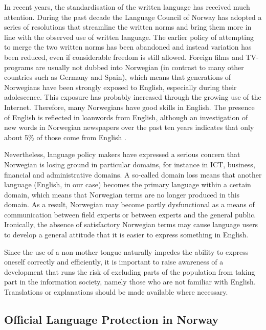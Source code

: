 \begin{multicols}{2}
In recent years, the standardisation of the written language has received much attention. 
During the past decade the Language Council of Norway has adopted a series of resolutions that streamline the written norms and bring them more in line with the observed use of written language. 
The earlier policy of attempting to merge the two written norms has been abandoned and instead variation has been reduced, even if considerable freedom is still allowed.
Foreign films and TV-programs are usually not dubbed into Norwegian (in contrast to many other countries such as Germany and Spain), which means that generations of Norwegians have been strongly exposed to English, especially during their adolescence. 
This exposure has probably increased through the growing use of the Internet. 
Therefore, many Norwegians have good skills in English. 
The presence of English is reflected in loanwords from English, although an investigation of new words in Norwegian newspapers over the past ten years indicates that only about 5\% of those come from English \cite{And:2011}.


Nevertheless, language policy makers have expressed a serious concern \cite{nih:2005} that Norwegian is losing ground in particular domains, for instance in ICT, business, financial and administrative domains. 
A so-called domain loss means that another language (English, in our case) becomes the primary language within a certain domain, which means that Norwegian terms are no longer produced in this domain. 
As a result, Norwegian may become partly dysfunctional as a means of communication between field experts or between experts and the general public. 
Ironically, the absence of satisfactory Norwegian terms may cause language users to develop a general attitude that it is easier to express something in English. 

Since the use of a non-mother tongue naturally impedes the ability to express oneself correctly and efficiently, it is important to raise awareness of a development that runs the risk of excluding parts of the population from taking part in the information society, namely those who are not familiar with English.
Translations or explanations should be made available where necessary.

\subsection{Official Language Protection in Norway}


\end{multicols}
